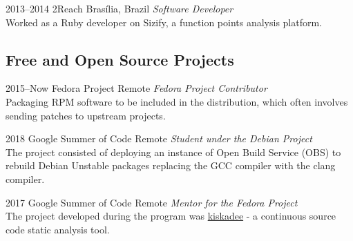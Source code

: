 \documentclass[print]{friggeri-cv}
\begin{document}
\begin{entrylist}


\entry
{2013--2014}
{2Reach}
{Brasília, Brazil}
{\emph{Software Developer} \\
  Worked as a Ruby developer on Sizify, a function points analysis platform.
  }




\end{entrylist}

\newpage
\subsection{Free and Open Source Projects}

\begin{entrylist}

\entry
{2015--Now}
{Fedora Project}
{Remote}
{\emph{Fedora Project Contributor} \\
Packaging RPM software to be included in the distribution, which often involves sending patches to upstream projects.
  }

\end{entrylist}
\begin{entrylist}


\entry
{2018}
{Google Summer of Code}
{Remote}
{\emph{Student under the Debian Project} \\
  The project consisted of deploying an instance of Open Build Service (OBS) to
  rebuild Debian Unstable packages replacing the GCC compiler with the clang
  compiler. \\
 }


\entry
{2017}
{Google Summer of Code}
{Remote}
{\emph{Mentor for the Fedora Project} \\
  The project developed during the program was
  \href{pagure.io/kiskadee}{kiskadee} - a continuous source code static
  analysis tool. \\
 }


\end{entrylist}
\end{document}
